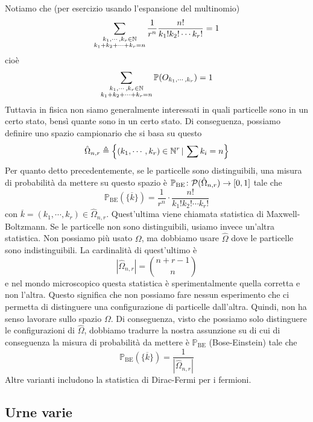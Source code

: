 \documentclass[a4paper]{article}
\begin{document}
Notiamo che (per esercizio usando l'espansione del multinomio) \[
    \sum_{\substack{k_1, \cdots, k_r \in \mathbb{N} \\ k_1 + k_2 + \cdots + k_r = n}}
    \frac{1}{r^n} \frac{n!}{k_1!k_2!\cdots k_r!} = 1
\]
cioè
\[
    \sum_{\substack{k_1, \cdots, k_r \in \mathbb{N} \\ k_1 + k_2 + \cdots + k_r = n}}
    \mathbb P(O_{k_1, \cdots, k_r}) = 1
\]
Tuttavia in fisica non siamo generalmente interessati in quali particelle sono in un certo stato,
bensì quante sono in un certo stato.
Di conseguenza, possiamo definire uno spazio campionario
che si basa su questo
\[
    \hat\Omega_{n,r} \triangleq \left\{
        (k_1, \cdots, k_r) \in \mathbb{N}^r \,|\,
        \sum k_i = n
    \right\}
\]
Per quanto detto precedentemente,
se le particelle sono distinguibili, una misura di probabilità da mettere su questo spazio
è \(\mathbb P_{\text{BE}} \colon \mathcal P(\hat\Omega_{n,r}) \to [0,1]\)
tale che
\[
    \mathbb P_{\text{BE}}(\{\overline k\})
    = \frac{1}{r^n} \cdot \frac{n!}{k_1!k_2!\cdots k_r!}
\]
con \(\overline k = (k_1, \cdots, k_r) \in \hat\Omega_{n,r}\).
Quest'ultima viene chiamata statistica di Maxwell-Boltzmann.
Se le particelle non sono distinguibili,
usiamo invece un'altra statistica. Non possiamo più usato \(\Omega\),
ma dobbiamo usare \(\hat\Omega\) dove le particelle sono indistinguibili.
La cardinalità di quest'ultimo è
\[
    |\hat\Omega_{n,r}| = \binom{n+r-1}{n}
\]
e nel mondo microscopico questa statistica è sperimentalmente quella corretta e non l'altra.
Questo significa che non possiamo fare nessun esperimento che ci permetta di distinguere
una configurazione di particelle dall'altra.
Quindi, non ha senso lavorare sullo spazio \(\Omega\).
Di conseguenza, visto che possiamo solo distinguere le configurazioni
di \(\hat\Omega\), dobbiamo tradurre la nostra assunzione su di cui
di conseguenza la misura di probabilità da mettere
è \(\mathbb P_{\text{BE}}\) (Bose-Einstein) tale che
\[
    \mathbb P_{\text{BE}}(\{\overline k\})
    = \frac{1}{|\hat\Omega_{n,r}|}
\]
Altre varianti includono la statistica di Dirac-Fermi per i fermioni.

\subsection{Urne varie}
\end{document}
